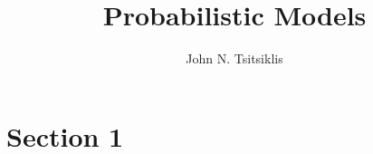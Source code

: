 \documentclass{tufte-handout}
\author{John N. Tsitsiklis}
\title{Probabilistic Models}
\theoremstyle{definition} \newtheorem{definition}{Definition}
\theoremstyle{definition} \newtheorem{remark}{Remark}
\begin{document}
\maketitle
\section{Section 1}
\end{document}
